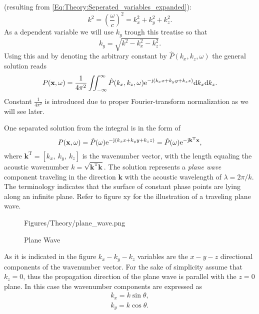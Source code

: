(resulting from \eqref{Eq:Theory:Seperated_variables_expanded}):
\begin{equation}
k^2 = \left( \frac{\omega}{c} \right)^2 = k_x^2 + k_y^2 + k_z^2.
\end{equation}
As a dependent variable we will use $k_y$ trough this treatise so that
\begin{equation}
k_y = \sqrt{ k^2 - k_x^2 - k_z^2 }.
\end{equation}
Using this and by denoting the arbitrary constant by $\hat{P}(k_x,k_z, \omega)$ the general solution reads
\begin{equation}
P(\mathbf{x},\omega) = \frac{1}{4\pi^2}\iint_{-\infty}^{\infty} \hat{P}(k_x,k_z, \omega)  \mathrm{e}^{- \mathrm{j} \left( k_x x + k_y y + k_z z \right) }
\mathrm{d} k_x\mathrm{d} k_z.
\label{Eq:Theory:Helmholtz_Inverse_Fourier}
\end{equation}
Constant $\frac{1}{4\pi^2}$ is introduced due to proper Fourier-transform normalization as we will see later.

\vspace{3mm}
One separated solution from the integral is in the form of \cite{Williams1999}
\begin{equation}
P(\mathbf{x},\omega) = \hat{P}(\omega) \mathrm{e}^{-\mathrm{j} \left( k_x x + k_y y + k_z z \right) } =  \hat{P}(\omega) \mathrm{e}^{-\mathrm{j} \mathbf{k}^{\mathrm{T}} \mathbf{x} },
\end{equation}
where $\mathbf{k}^{\mathrm{T}} = [k_x,\ k_y,\ k_z]$ is the wavenumber vector, with the length equaling the acoustic wavenumber $k = \sqrt{ \mathbf{k}^{\mathrm{T}}  \mathbf{k}}$.
The solution represents a \emph{plane wave} component traveling in the direction $\mathbf{k}$ with the acoustic wavelength of $\lambda = 2\pi/k$. The terminology indicates that the surface of constant phase points are lying along an infinite plane. Refer to figure xy for the illustration of a traveling plane wave.

\begin{figure}[!h]
	\centering
	\begin{overpic}[width = 1\columnwidth]{Figures/Theory/plane_wave.png}
	\end{overpic}
\caption{Plane Wave}
	\label{Fig:Theory:plane_wave}
\end{figure}

As it is indicated in the figure $k_x-k_y-k_z$ variables are the $x-y-z$ directional components of the wavenumber vector. For the sake of simplicity assume that $k_z = 0$, thus the propagation direction of the plane wave is parallel with the $z=0$ plane. In this case the wavenumber components are expressed as
\begin{eqnarray}
k_x = k \sin \theta , \\
k_y = k \cos \theta .
\end{eqnarray}
  
